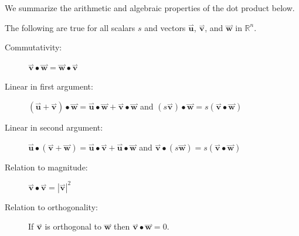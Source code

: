 \documentclass{ximera}
\begin{document}
We summarize the arithmetic and algebraic properties of the dot
product below.
\begin{theorem}
  The following are true for all scalars $s$ and vectors
  $\overset{\boldsymbol{\rightharpoonup}}{\mathbf{u}}$, $\overset{\boldsymbol{\rightharpoonup}}{\mathbf{v}}$, and $\overset{\boldsymbol{\rightharpoonup}}{\mathbf{w}}$ in $\mathbb{R}^n$.
  \begin{description}
  \item[Commutativity:] $\overset{\boldsymbol{\rightharpoonup}}{\mathbf{v}} \bullet \overset{\boldsymbol{\rightharpoonup}}{\mathbf{w}} = \overset{\boldsymbol{\rightharpoonup}}{\mathbf{w}} \bullet
    \overset{\boldsymbol{\rightharpoonup}}{\mathbf{v}}$
  \item[Linear in first argument:] $(\overset{\boldsymbol{\rightharpoonup}}{\mathbf{u}}+\overset{\boldsymbol{\rightharpoonup}}{\mathbf{v}})\bullet \overset{\boldsymbol{\rightharpoonup}}{\mathbf{w}} = \overset{\boldsymbol{\rightharpoonup}}{\mathbf{u}}\bullet \overset{\boldsymbol{\rightharpoonup}}{\mathbf{w}} +
    \overset{\boldsymbol{\rightharpoonup}}{\mathbf{v}}\bullet \overset{\boldsymbol{\rightharpoonup}}{\mathbf{w}}$ and $(s\overset{\boldsymbol{\rightharpoonup}}{\mathbf{v}})\bullet \overset{\boldsymbol{\rightharpoonup}}{\mathbf{w}} = s(\overset{\boldsymbol{\rightharpoonup}}{\mathbf{v}}
    \bullet \overset{\boldsymbol{\rightharpoonup}}{\mathbf{w}})$
  \item[Linear in second argument:] $\overset{\boldsymbol{\rightharpoonup}}{\mathbf{u}} \bullet (\overset{\boldsymbol{\rightharpoonup}}{\mathbf{v}}+\overset{\boldsymbol{\rightharpoonup}}{\mathbf{w}}) = \overset{\boldsymbol{\rightharpoonup}}{\mathbf{u}}\bullet \overset{\boldsymbol{\rightharpoonup}}{\mathbf{v}}+
    \overset{\boldsymbol{\rightharpoonup}}{\mathbf{u}}\bullet \overset{\boldsymbol{\rightharpoonup}}{\mathbf{w}}$ and $\overset{\boldsymbol{\rightharpoonup}}{\mathbf{v}} \bullet (s\overset{\boldsymbol{\rightharpoonup}}{\mathbf{w}}) = s(\overset{\boldsymbol{\rightharpoonup}}{\mathbf{v}}
    \bullet \overset{\boldsymbol{\rightharpoonup}}{\mathbf{w}})$
  \item[Relation to magnitude:] $\overset{\boldsymbol{\rightharpoonup}}{\mathbf{v}} \bullet \overset{\boldsymbol{\rightharpoonup}}{\mathbf{v}} = |\overset{\boldsymbol{\rightharpoonup}}{\mathbf{v}}|^2$
  \item[Relation to orthogonality:] If $\overset{\boldsymbol{\rightharpoonup}}{\mathbf{v}}$ is orthogonal to
    $\overset{\boldsymbol{\rightharpoonup}}{\mathbf{w}}$ then $\overset{\boldsymbol{\rightharpoonup}}{\mathbf{v}} \bullet \overset{\boldsymbol{\rightharpoonup}}{\mathbf{w}} = 0$.
  \end{description}
\end{theorem}
\end{document}
